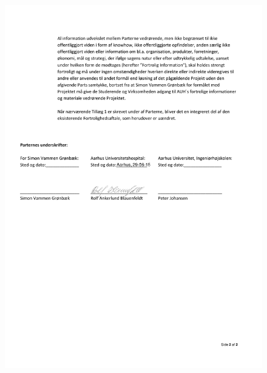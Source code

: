 \begin{figure}[H]
	\includegraphics[width = 1\textwidth]{billeder/FortrolighedsaftalePersonligSide2.pdf}
\end{figure}
